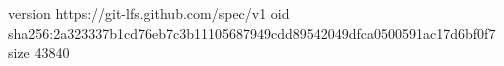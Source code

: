 version https://git-lfs.github.com/spec/v1
oid sha256:2a323337b1cd76eb7c3b11105687949cdd89542049dfca0500591ac17d6bf0f7
size 43840
